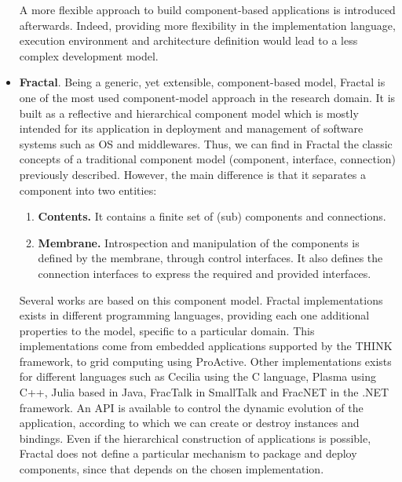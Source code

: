 \begin{itemize}
	A more flexible approach to build component-based applications is introduced afterwards.
	Indeed, providing more flexibility in the implementation language, execution environment and architecture definition would lead to a less complex development model.

	\item \textbf{Fractal}.	Being a generic, yet extensible, component-based model, Fractal\cite{bruneton2006fractal} is one of the most used component-model approach in the research domain.
	It is built as a reflective and hierarchical component model which is mostly intended for its application in deployment and management of software systems such as OS and middlewares.
	Thus, we can find in Fractal the classic concepts of a traditional component model (component, interface, connection) previously described.
	However, the main difference is that it separates a component into two entities:
	\begin{enumerate}
		\item \textbf{Contents.} It contains a finite set of (sub) components and connections.
		\item \textbf{Membrane.} Introspection and manipulation of the components is defined by the membrane, through control interfaces.
		It also defines the connection interfaces to express the required and provided interfaces.
	\end{enumerate}

	Several works\cite{david2005wildcat}\cite{bouchenak2006autonomic}\cite{leclercq2004dream}\cite{romero2010restful} are based on this component model.
	Fractal implementations exists in different programming languages, providing each one additional properties to the model, specific to a particular domain.
	This implementations come from embedded applications supported by the THINK framework\cite{fassino2002think}\cite{polakovic2006building}\cite{hoang2008valentine}, to grid computing using ProActive\cite{caromel2006proactive}.
	Other implementations exists for different languages such as Cecilia\cite{cecilia2015} using the C language, Plasma using C++, Julia\cite{bruneton2006fractal} based in Java, FracTalk in SmallTalk and FracNET in the .NET framework.
	An API is available to control the dynamic evolution of the application, according to which we can create or destroy instances and bindings.
	Even if the hierarchical construction of applications is possible, Fractal does not define a particular mechanism to package and deploy components, since that depends on the chosen implementation.
\end{itemize}

